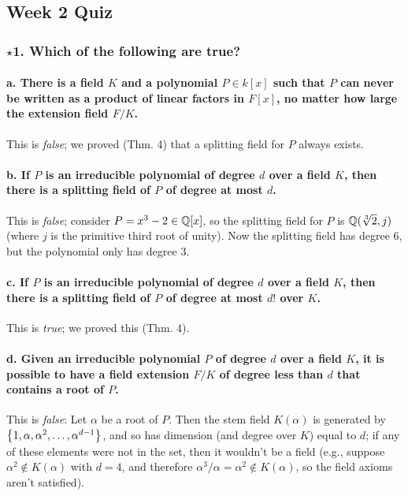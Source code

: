 \subsection[Quiz]{Week 2 Quiz}

\subsubsection*{$\star$1. Which of the following are true?}
\paragraph*{a. There is a field $K$ and a polynomial $P \in k[x]$ such that $P$ can never be written as a product of linear factors in $F[x]$, no matter how large the extension field $F/K$.}
This is \emph{false}; we proved (Thm. 4) that a splitting field for $P$ always exists.

\paragraph*{b. If $P$ is an irreducible polynomial of degree $d$ over a field $K$, then there is a splitting field of $P$ of degree at most $d$.}
This is \emph{false}; consider $P = x^3 - 2 \in \mathbb{Q}[x]$, so the splitting field for $P$ is $\mathbb{Q}(\sqrt[3]{2}, j)$ (where $j$ is the primitive third root of unity). Now the splitting field has degree 6, but the polynomial only has degree 3. 

\paragraph*{c. If $P$ is an irreducible polynomial of degree $d$ over a field $K$, then there is a splitting field of $P$ of degree at most $d!$ over $K$.}
This is \emph{true}; we proved this (Thm. 4).

\paragraph*{d. Given an irreducible polynomial $P$ of degree $d$ over a field $K$, it is possible to have a field extension $F/K$ of degree less than $d$ that contains a root of $P$.}
This is \emph{false}: Let $\alpha$ be a root of $P$. Then the stem field $K(\alpha)$ is generated by $\left\{1, \alpha, \alpha^2, \dotsc, \alpha^{d-1}\right\}$, and so has dimension (and degree over $K$) equal to $d$; if any of these elements were not in the set, then it wouldn't be a field (e.g., suppose $\alpha^2 \notin K(\alpha)$ with $d = 4$, and therefore $\alpha^3 / \alpha = \alpha^2 \notin K(\alpha)$, so the field axioms aren't satisfied).

